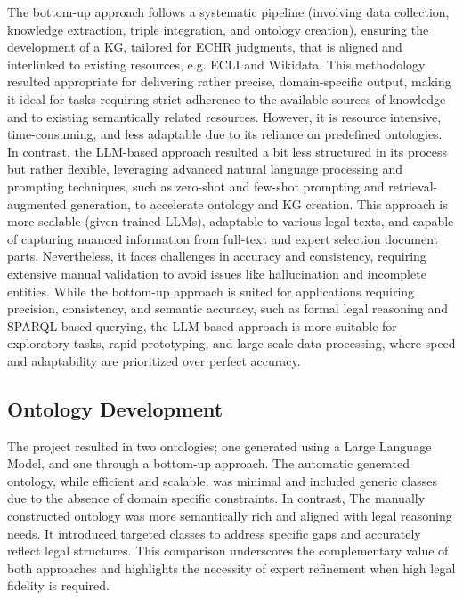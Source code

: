 \documentclass[runningheads]{llncs}
\begin{document}
The bottom-up approach %
follows a systematic pipeline (involving data collection, knowledge extraction, triple integration, and ontology creation), ensuring the development of %
a KG, tailored for ECHR judgments, that is aligned and interlinked to existing resources, e.g. ECLI and Wikidata. %
This methodology resulted appropriate for delivering rather precise, domain-specific output, making it ideal for tasks requiring strict adherence to the available sources of knowledge and to existing semantically related resources. However, it is resource intensive, time-consuming, and less adaptable %
due to its reliance on predefined ontologies. In contrast, the LLM-based approach resulted a bit less structured in its process but rather flexible, leveraging advanced natural language processing and prompting techniques, such as zero-shot and few-shot prompting and retrieval-augmented generation, to accelerate ontology and KG creation. This approach is more scalable (given trained LLMs), adaptable to various legal texts, and capable of capturing nuanced information from full-text and expert selection document parts. Nevertheless, it faces challenges in accuracy and consistency, requiring extensive manual validation to avoid issues like hallucination and incomplete entities. While the bottom-up approach is suited for applications requiring precision, consistency, and semantic accuracy, such as formal legal reasoning and SPARQL-based querying, the LLM-based approach is more suitable for exploratory tasks, rapid prototyping, and large-scale data processing, where speed and adaptability are prioritized over perfect accuracy. 


\subsection{Ontology Development}
The project resulted in two ontologies; one generated using a Large Language Model, and one through a bottom-up approach. The automatic generated ontology, while efficient and scalable, was minimal and included generic classes due to the absence of domain specific constraints. In contrast, The manually constructed ontology was more semantically rich and aligned with legal reasoning needs. It introduced targeted classes to address specific gaps and accurately reflect legal structures. This comparison underscores the complementary value of both approaches and highlights the necessity of expert refinement when high legal fidelity is required. 
\end{document}
